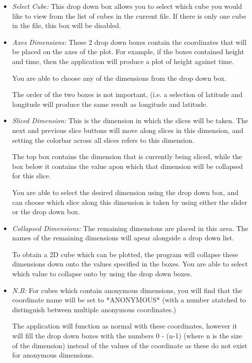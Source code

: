 \documentclass[a4paper,12pt]{article}
\begin{document}
\begin{itemize}

\item
\emph{Select Cube:} This drop down box allows you to select which cube you
would like to view from the list of cubes in the current file. If there is
only one cube in the file, this box will be disabled.

\item
\emph{Axes Dimensions:} These 2 drop down boxes contain the coordinates that
will be placed on the axes of the plot. For example, if the boxes contained
height and time, then the application will produce a plot of height against
time.

You are able to choose any of the dimensions from the drop down box.

The order of the two boxes is not important, (i.e. a selection of latitude
and longitude will produce the same result as longitude and latitude.

\item
\emph{Sliced Dimension:} This is the dimension in which the slices will
be taken. The next and previous slice buttons will move along slices in this
dimension, and setting the colorbar across all slices refers to this dimension.

The top box contains the dimension that is currently being sliced, while the
box below it contains the value apon which that dimension will be collapsed
for this slice.

You are able to select the desired dimension using the drop down box, and
can choose which slice along this dimension is taken by using either the
slider or the drop down box.

\item
\emph{Collapsed Dimensions:} The remaining dimensions are placed in this area.
The names of the remaining dimensions will apear alongside a drop down list.

To obtain a 2D cube which can be plotted, the program will collapse these
dimensions down onto the values specified in the boxes. You are able to select
which value to collapse onto by using the drop down boxes.

\item
\emph{N.B:} For cubes which contain anonymous dimensions, you will find that
the coordinate name will be set to *ANONYMOUS* (with a number atatched to
distinguish between multiple anonymous coordinates.)

The application will function as normal with these coordinates, however it
will fill the drop down boxes with the numbers 0 - (n-1) (where n is the size
of the dimension) instead of the values of the coordinate as these do not exist
for anonymous dimensions.

\end{itemize}
\end{document}
